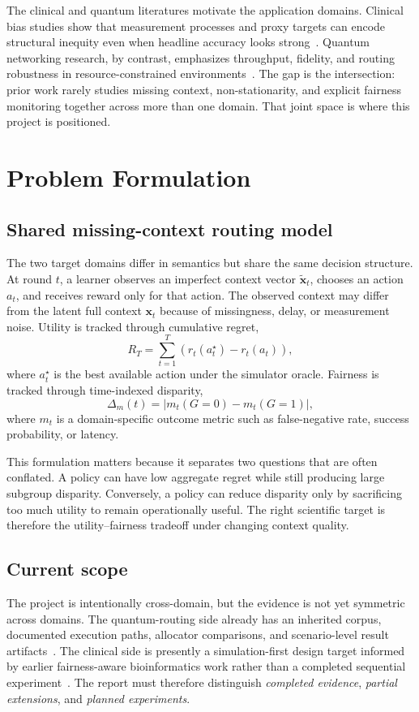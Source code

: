 \documentclass[conference]{IEEEtran}
\begin{document}
The clinical and quantum literatures motivate the application domains. Clinical bias studies show that measurement processes and proxy targets can encode structural inequity even when headline accuracy looks strong~\cite{obermeyer2019dissecting}. Quantum networking research, by contrast, emphasizes throughput, fidelity, and routing robustness in resource-constrained environments~\cite{wehner2018quantum,pant2019routing,caleffi2017optimal}. The gap is the intersection: prior work rarely studies missing context, non-stationarity, and explicit fairness monitoring together across more than one domain. That joint space is where this project is positioned.

\section{Problem Formulation}
\subsection{Shared missing-context routing model}
The two target domains differ in semantics but share the same decision structure. At round $t$, a learner observes an imperfect context vector $\tilde{\mathbf{x}}_t$, chooses an action $a_t$, and receives reward only for that action. The observed context may differ from the latent full context $\mathbf{x}_t$ because of missingness, delay, or measurement noise. Utility is tracked through cumulative regret,
\begin{equation}
R_T = \sum_{t=1}^{T}\left(r_t(a_t^\star) - r_t(a_t)\right),
\end{equation}
where $a_t^\star$ is the best available action under the simulator oracle. Fairness is tracked through time-indexed disparity,
\begin{equation}
\Delta_m(t) = \left|m_t(G=0)-m_t(G=1)\right|,
\end{equation}
where $m_t$ is a domain-specific outcome metric such as false-negative rate, success probability, or latency.

This formulation matters because it separates two questions that are often conflated. A policy can have low aggregate regret while still producing large subgroup disparity. Conversely, a policy can reduce disparity only by sacrificing too much utility to remain operationally useful. The right scientific target is therefore the utility--fairness tradeoff under changing context quality.

\subsection{Current scope}
The project is intentionally cross-domain, but the evidence is not yet symmetric across domains. The quantum-routing side already has an inherited corpus, documented execution paths, allocator comparisons, and scenario-level result artifacts~\cite{garcia2026threat_aware_quantum_routing}. The clinical side is presently a simulation-first design target informed by earlier fairness-aware bioinformatics work rather than a completed sequential experiment~\cite{garcia2025equitable_bioinformatics}. The report must therefore distinguish \emph{completed evidence}, \emph{partial extensions}, and \emph{planned experiments}.
\end{document}
